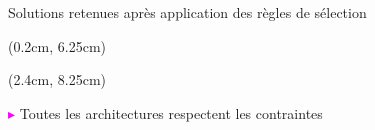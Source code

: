 \documentclass[french]{beamer}
\begin{document}
\begin{frame}{Solutions retenues après application des règles de sélection}
{\tiny
\begin{textblock*}{12cm}(0.2cm, 6.25cm)
\begin{table}[h!]
\centering
\renewcommand{\arraystretch}{1.1}	%
\setlength{\tabcolsep}{0.045\linewidth}
\end{table}
\end{textblock*}
}

{\scriptsize
\begin{textblock*}{8cm}(2.4cm, 8.25cm)
\begin{alertblock}{}
\centering
\textbf{\textcolor{magenta}{$\blacktriangleright$}} Toutes les architectures respectent les contraintes
\end{alertblock}
\end{textblock*}
}

\end{frame}

%
%
%
\end{document}
